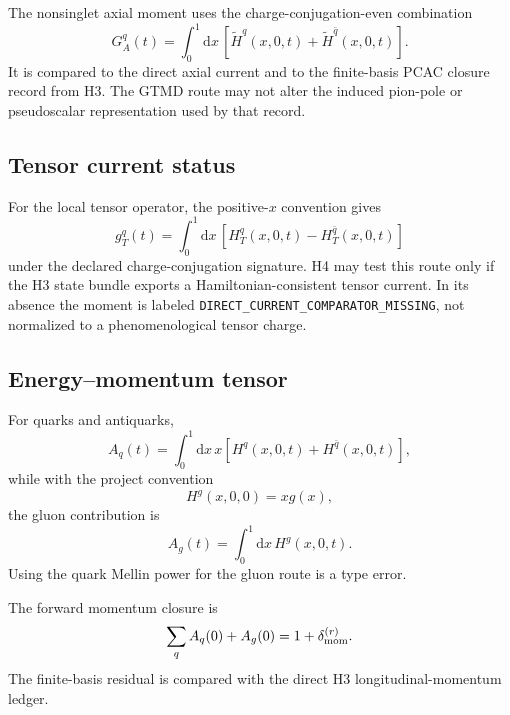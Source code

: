 \documentclass[11pt]{article}
\newcommand{\dd}{\mathrm{d}}
\begin{document}
The nonsinglet axial moment uses the charge-conjugation-even combination
\begin{equation}
 G_A^q(t)
 =\int_0^1\dd x\,
 \left[\widetilde H^q(x,0,t)+
       \widetilde H^{\bar q}(x,0,t)\right].
 \label{eq:axial-moment}
\end{equation}
It is compared to the direct axial current and to the finite-basis PCAC
closure record from H3.  The GTMD route may not alter the induced pion-pole or
pseudoscalar representation used by that record.

\subsection{Tensor current status}

For the local tensor operator, the positive-\(x\) convention gives
\begin{equation}
 g_T^q(t)
 =\int_0^1\dd x\,
 \left[H_T^q(x,0,t)-H_T^{\bar q}(x,0,t)\right]
 \label{eq:tensor-moment}
\end{equation}
under the declared charge-conjugation signature.  H4 may test this route only
if the H3 state bundle exports a Hamiltonian-consistent tensor current.  In its
absence the moment is labeled \texttt{DIRECT\_CURRENT\_COMPARATOR\_MISSING},
not normalized to a phenomenological tensor charge.

\subsection{Energy--momentum tensor}

For quarks and antiquarks,
\begin{equation}
 A_q(t)
 =\int_0^1\dd x\,x
 \left[H^q(x,0,t)+H^{\bar q}(x,0,t)\right],
 \label{eq:quark-emt-moment}
\end{equation}
while with the project convention
\begin{equation}
 H^g(x,0,0)=xg(x),
 \end{equation}
the gluon contribution is
\begin{equation}
 A_g(t)
 =\int_0^1\dd x\,H^g(x,0,t).
 \label{eq:gluon-emt-moment}
\end{equation}
Using the quark Mellin power for the gluon route is a type error.

The forward momentum closure is
\begin{equation}
 \sum_q A_q(0)+A_g(0)=1+\delta_{\rm mom}^{(r)}.
 \label{eq:emt-momentum-closure}
\end{equation}
The finite-basis residual is compared with the direct H3 longitudinal-momentum
ledger.
\end{document}
